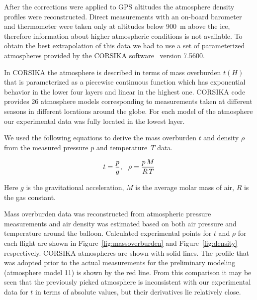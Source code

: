 \documentclass[universe,article,submit,moreauthors,pdftex]{Definitions/mdpi}
\begin{document}
\begin{paracol}{2}
After the corrections were applied to GPS altitudes the atmosphere density profiles were reconstructed. Direct measurements with an on-board barometer and thermometer were taken only at altitudes below 900~m above the ice, therefore information about higher atmospheric conditions is not available. To obtain the best extrapolation of this data we had to use a set of parameterized atmospheres provided by the CORSIKA software~\cite{hec98} version 7.5600.

In CORSIKA the atmosphere is described in terms of mass overburden $t(H)$ that is parameterized as a piecewise continuous function which has exponential behavior in the lower four layers and linear in the highest one. CORSIKA code provides 26 atmosphere models corresponding to measurements taken at different seasons in different locations around the globe. For each model of the atmosphere our experimental data was fully located in the lowest layer.

We used the following equations to derive the mass overburden $t$ and density $\rho$ from the measured pressure $p$ and temperature~$T$ data.

\begin{equation}
t     = \frac{p}{g}, \\ \hspace{7pt}
\rho  = \frac{p \, M}{R \, T} \\
\end{equation}


Here $g$ is the gravitational acceleration, $M$ is the average molar mass of air, $R$ is the gas constant.

Mass overburden data was reconstructed from atmospheric pressure measurements and air density was estimated based on both air pressure and temperature around the balloon. Calculated experimental points for $t$ and $\rho$ for each flight are shown in Figure~\ref{fig:massoverburden} and Figure~\ref{fig:density} respectively. CORSIKA atmospheres are shown with solid lines. The profile that was adopted prior to the actual measurements for the preliminary modeling (atmosphere model 11) is shown by the red line. From this comparison it may be seen that the previously picked atmosphere is inconsistent with our experimental data for $t$ in terms of absolute values, but their derivatives lie relatively close. 




\end{paracol}
\end{document}
